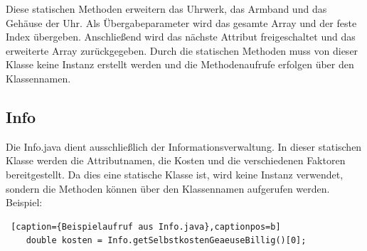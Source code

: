 Diese statischen Methoden erweitern das Uhrwerk, das Armband und das Gehäuse der Uhr. Als Übergabeparameter wird das gesamte Array und der feste Index übergeben. Anschließend wird das nächste Attribut freigeschaltet und das erweiterte Array zurückgegeben. Durch die statischen Methoden muss von dieser Klasse keine Instanz erstellt werden und die Methodenaufrufe erfolgen über den Klassennamen.

\subsection{Info}
Die Info.java dient ausschließlich der Informationsverwaltung. In dieser statischen Klasse werden die Attributnamen, die Kosten und die verschiedenen Faktoren bereitgestellt. Da dies eine statische Klasse ist, wird keine Instanz verwendet, sondern die Methoden können über den Klassennamen aufgerufen werden. \\
Beispiel:

\lstset{language=Java}
\begin{lstlisting} [caption={Beispielaufruf aus Info.java},captionpos=b]
	double kosten = Info.getSelbstkostenGeaeuseBillig()[0];
\end{lstlisting}